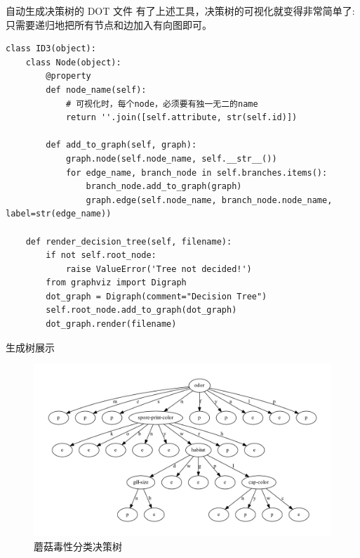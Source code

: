 \documentclass[10pt]{beamer}
\begin{document}
\begin{frame}{自动生成决策树的 DOT 文件}
有了上述工具，决策树的可视化就变得非常简单了:只需要递归地把所有节点和边加入有向图即可。
\begin{verbatim}
class ID3(object):
    class Node(object):
        @property
        def node_name(self):
            # 可视化时，每个node，必须要有独一无二的name
            return ''.join([self.attribute, str(self.id)])

        def add_to_graph(self, graph):
            graph.node(self.node_name, self.__str__())
            for edge_name, branch_node in self.branches.items():
                branch_node.add_to_graph(graph)
                graph.edge(self.node_name, branch_node.node_name, label=str(edge_name))

    def render_decision_tree(self, filename):
        if not self.root_node:
            raise ValueError('Tree not decided!')   
        from graphviz import Digraph
        dot_graph = Digraph(comment="Decision Tree")
        self.root_node.add_to_graph(dot_graph)
        dot_graph.render(filename)                    
\end{verbatim}
\end{frame}

\begin{frame}{生成树展示}
\begin{figure}[H]
  \includegraphics[width=\textwidth]{../mushroom_data/dtree.pdf}
  \caption{蘑菇毒性分类决策树}
\end{figure}            
\end{frame}
\end{document}
